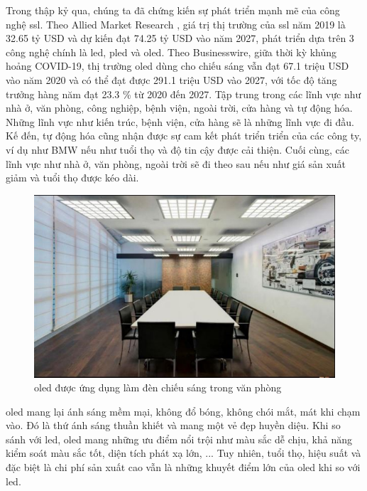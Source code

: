 Trong thập kỷ qua, chúng ta đã chứng kiến sự phát triển mạnh mẽ của công nghệ \ac{ssl}. Theo Allied Market Research \cite{ssl_market}, giá trị thị trường của \ac{ssl} năm 2019 là 32.65 tỷ USD và dự kiến đạt 74.25 tỷ USD vào năm 2027, phát triển dựa trên 3 công nghệ chính là \ac{led}, \ac{pled} và \ac{oled}. Theo Businesswire\cite{oled_market}, giữa thời kỳ khủng hoảng COVID-19, thị trường \ac{oled} dùng cho chiếu sáng vẫn đạt 67.1 triệu USD vào năm 2020 và có thể đạt được 291.1 triệu USD vào 2027, với tốc độ tăng trưởng hàng năm đạt 23.3 \% từ 2020 đến 2027. Tập trung trong các lĩnh vực như nhà ở, văn phòng, công nghiệp, bệnh viện, ngoài trời, cửa hàng và tự động hóa. Những lĩnh vực như kiến trúc, bệnh viện, cửa hàng sẽ là những lĩnh vực đi đầu. Kế đến, tự động hóa cũng nhận được sự cam kết phát triển triển của các công ty, ví dụ như BMW nếu như tuổi thọ và độ tin cậy được cải thiện. Cuối cùng, các lĩnh vực như nhà ở, văn phòng, ngoài trời sẽ đi theo sau nếu như giá sản xuất giảm và tuổi thọ được kéo dài.

\begin{figure} [ht]
	\centering
	\captionsetup{justification=centering}
	\includegraphics [scale=0.7] {Image/OLED_in_office}
	\caption{\ac{oled} được ứng dụng làm đèn chiếu sáng trong văn phòng \cite{oledworks}}
\end{figure}

\ac{oled} mang lại ánh sáng mềm mại, không đổ bóng, không chói mắt, mát khi chạm vào. Đó là thứ ánh sáng thuần khiết và mang một vẻ đẹp huyền diệu. Khi so sánh với \ac{led}, \ac{oled} mang những ưu điểm nổi trội như  màu sắc dễ chịu, khả năng kiểm soát màu sắc tốt, diện tích phát xạ lớn, ... Tuy nhiên, tuổi thọ, hiệu suất và đặc biệt là chi phí sản xuất cao vẫn là những khuyết điểm lớn của \ac{oled} khi so với \ac{led}.

